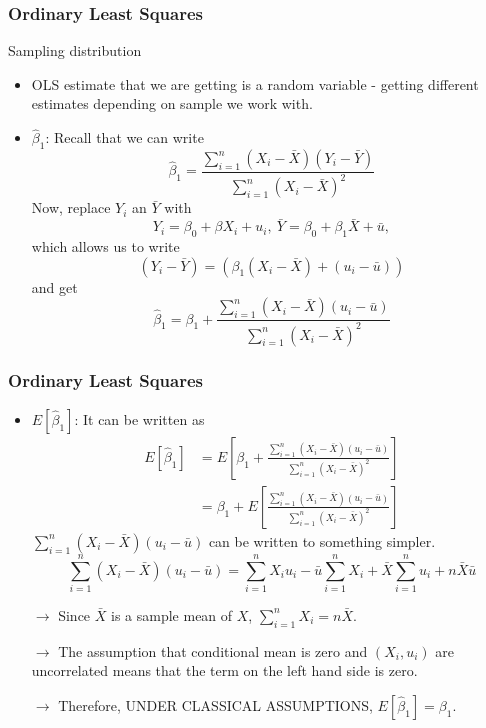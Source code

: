 \documentclass[compress]{beamer}
\begin{document}
\begin{frame}
\frametitle{Ordinary Least Squares}
Sampling distribution 
\begin{itemize}
\item OLS estimate that we are getting is a random variable - getting different estimates depending on sample we work with. 
\item$\hat{\beta}_1$: Recall that we can write
\[
\hat{\beta}_1= \frac{\sum_{i=1}^n(X_i-\bar{X})(Y_i-\bar{Y})}{\sum_{i=1}^n(X_i-\bar{X})^2}
\]
Now, replace $Y_i$ an $\bar{Y}$ with 
\[
Y_i =\beta_0 + \beta X_i + u_i, \ \bar{Y} = \beta_0 + \beta_1\bar{X} + \bar{u},
\]
which allows us to write 
\[
(Y_i-\bar{Y}) = (\beta_1(X_i-\bar{X})+(u_i-\bar{u}))
\]
and get
\[
\hat{\beta}_1=\beta_1+  \frac{\sum_{i=1}^n(X_i-\bar{X})(u_i-\bar{u})}{\sum_{i=1}^n(X_i-\bar{X})^2}
\]

\end{itemize}
\end{frame}

\begin{frame}
\frametitle{Ordinary Least Squares}
\begin{itemize}
\item $E[\hat{\beta}_1]$: It can be written as
\small{\[
\begin{aligned}
E[\hat{\beta}_1]& = E\left[\beta_1+  \frac{\sum_{i=1}^n(X_i-\bar{X})(u_i-\bar{u})}{\sum_{i=1}^n(X_i-\bar{X})^2}\right]\\
&=\beta_1+ E\left[\frac{\sum_{i=1}^n(X_i-\bar{X})(u_i-\bar{u})}{\sum_{i=1}^n(X_i-\bar{X})^2}\right]
\end{aligned}
\]}\normalsize
$\sum_{i=1}^n(X_i-\bar{X})(u_i-\bar{u})$ can be written to something simpler.
\small{\[
\sum_{i=1}^n(X_i-\bar{X})(u_i-\bar{u})=\sum_{i=1}^nX_iu_i-\bar{u}\sum_{i=1}^n X_i+\bar{X}\sum_{i=1}^nu_i+n\bar{X}\bar{u}
\]}\normalsize
\item[$\to$] Since $\bar{X}$ is a sample mean of $X$, $\sum_{i=1}^nX_i=n\bar{X}$. \\
\item[$\to$] The assumption that conditional mean is zero and $(X_i, u_i)$ are uncorrelated means that the term on the left hand side is zero. 
\item[$\to$] Therefore, UNDER CLASSICAL ASSUMPTIONS, $E[\hat{\beta}_1]=\beta_1$.

\end{itemize}
\end{frame}
\end{document}
